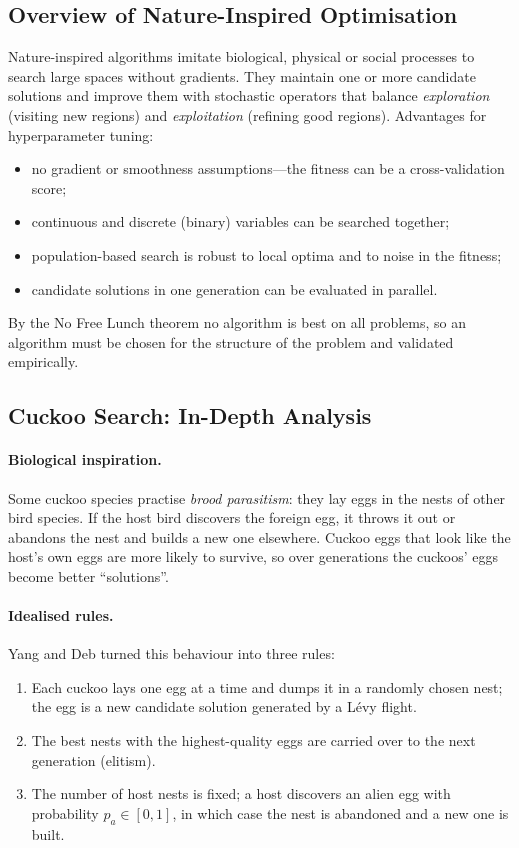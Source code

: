 \documentclass[12pt,a4paper]{article}
\numberwithin{equation}{section}
\numberwithin{table}{section}
\numberwithin{figure}{section}
\begin{document}
\subsection{Overview of Nature-Inspired Optimisation}
Nature-inspired algorithms imitate biological, physical or social processes to search large spaces without gradients. They maintain one or more candidate solutions and improve them with stochastic operators that balance \emph{exploration} (visiting new regions) and \emph{exploitation} (refining good regions). Advantages for hyperparameter tuning:
\begin{itemize}
  \item no gradient or smoothness assumptions---the fitness can be a cross-validation score;
  \item continuous and discrete (binary) variables can be searched together;
  \item population-based search is robust to local optima and to noise in the fitness;
  \item candidate solutions in one generation can be evaluated in parallel.
\end{itemize}
By the No Free Lunch theorem \cite{wolpert1997} no algorithm is best on all problems, so an algorithm must be chosen for the structure of the problem and validated empirically.

\subsection{Cuckoo Search: In-Depth Analysis}

\paragraph{Biological inspiration.} Some cuckoo species practise \emph{brood parasitism}: they lay eggs in the nests of other bird species. If the host bird discovers the foreign egg, it throws it out or abandons the nest and builds a new one elsewhere. Cuckoo eggs that look like the host's own eggs are more likely to survive, so over generations the cuckoos' eggs become better ``solutions''.

\paragraph{Idealised rules.} Yang and Deb \cite{yang2009} turned this behaviour into three rules:
\begin{enumerate}
  \item Each cuckoo lays one egg at a time and dumps it in a randomly chosen nest; the egg is a new candidate solution generated by a Lévy flight.
  \item The best nests with the highest-quality eggs are carried over to the next generation (elitism).
  \item The number of host nests is fixed; a host discovers an alien egg with probability $p_a \in [0,1]$, in which case the nest is abandoned and a new one is built.
\end{enumerate}
\end{document}
